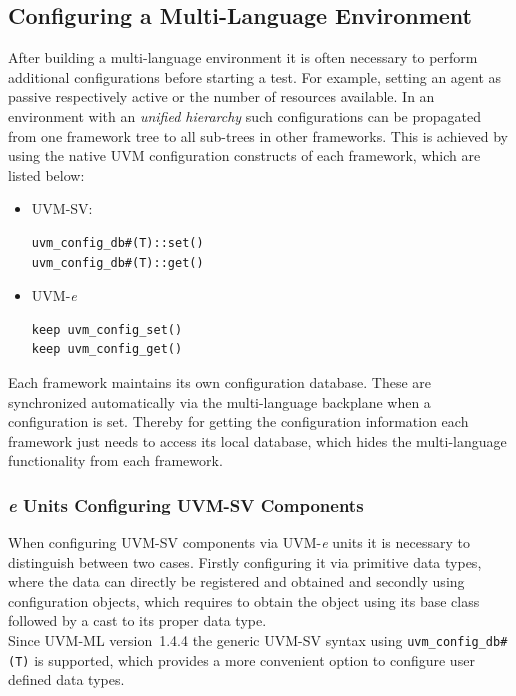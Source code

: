 \subsection{Configuring a Multi-Language Environment} \label{ml_config}
After building a multi-language environment it is often necessary to perform additional configurations before starting a
test. For example, setting an agent as passive respectively active or the number of resources available. In an
environment with an \emph{unified hierarchy} such configurations can be propagated from one framework tree
to all sub-trees in other frameworks. This is achieved by using the native UVM configuration constructs of each
framework, which are listed below:
\begin{itemize}
\item{UVM-SV:}
{}
\begin{lstlisting}
uvm_config_db#(T)::set()
uvm_config_db#(T)::get()
\end{lstlisting} 

\item{UVM-\textit{e}}
{}
\begin{lstlisting}
keep uvm_config_set()
keep uvm_config_get()
\end{lstlisting} 
\end{itemize}

Each framework maintains its own configuration database. These are synchronized automatically via the multi-language
backplane when a configuration is set. Thereby for getting the configuration information each framework just needs to
access its local database, which hides the multi-language functionality from each framework.

\subsubsection{\textit{e} Units Configuring UVM-SV Components}\label{e_config_sv}

When configuring UVM-SV components via UVM-\textit{e} units it is necessary to distinguish between two cases. Firstly
configuring it via primitive data types, where the data can directly be registered and obtained and secondly using
configuration objects, which requires to obtain the object using its base class followed by a cast to its proper data
type.\\
Since UVM-ML version~1.4.4 the generic UVM-SV syntax using \lstinline$uvm_config_db#(T)$ is supported, which
provides a more convenient option to configure user defined data types. 

